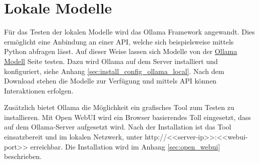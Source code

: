 \section{Lokale Modelle}
Für das Testen der lokalen Modelle wird das Ollama Framework angewandt. Dies ermöglicht eine Anbindung an einer API, welche sich beispielsweise mittels Python abfragen lässt. Auf dieser Weise lassen sich Modelle von der \href{https://ollama.com/search}{Ollama Modell} Seite testen. Dazu wird Ollama auf dem Server installiert und konfiguriert, siehe Anhang \ref{sec:install_config_ollama_local}. Nach dem Download stehen die Modelle zur Verfügung und mittels API können Interaktionen erfolgen.\vspace{0.2cm}

Zusätzlich bietet Ollama die Möglichkeit ein grafisches Tool zum Testen zu installieren. Mit Open WebUI wird ein Browser basierendes Toll eingesetzt, dass auf dem Ollama-Server aufgesetzt wird. Nach der Installation ist das Tool einsatzbereit und im lokalen Netzwerk, unter http://<<server-ip>>:<<webui-port>> erreichbar. Die Installation wird im Anhang \ref{sec:open_webui} beschrieben.







